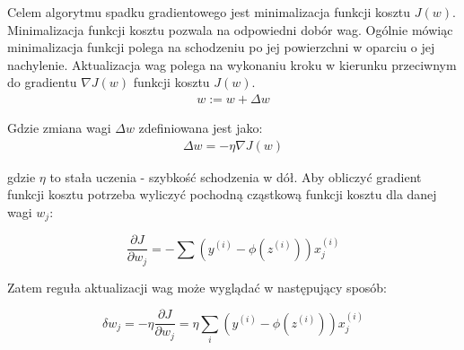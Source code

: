Celem algorytmu spadku gradientowego jest minimalizacja funkcji kosztu $J(w)$. Minimalizacja funkcji kosztu pozwala na odpowiedni dobór wag. Ogólnie mówiąc minimalizacja funkcji polega na schodzeniu po jej powierzchni w oparciu o jej nachylenie. Aktualizacja wag polega na wykonaniu kroku w kierunku przeciwnym do gradientu $\nabla J(w)$ funkcji kosztu $J(w)$.
\begin{gather*} 
w := w + \Delta w
\end{gather*}

Gdzie zmiana wagi $\Delta w$ zdefiniowana jest jako:
\begin{gather*} 
\Delta w = - \eta \nabla J(w)
\end{gather*}

gdzie $\eta$ to stała uczenia - szybkość schodzenia w dół. Aby obliczyć gradient funkcji kosztu potrzeba wyliczyć pochodną cząstkową funkcji kosztu dla danej wagi $w_{j}$:

\begin{equation}
\frac{\partial J}{\partial w_{j}} = - \sum ( y^{(i)} - \phi(z^{(i)})) x_{j}^{(i)}
\end{equation}

Zatem reguła aktualizacji wag może wyglądać w następujący sposób:

\begin{equation}
	 \delta w_{j} = -\eta \frac{\partial J}{\partial w_{j}} = \eta \sum_{i} ( y^{(i)} - \phi(z^{(i)})) x_{j}^{(i)}
\end{equation}

